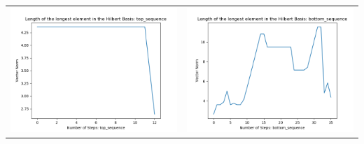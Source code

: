\documentclass[10pt]{article}
\begin{document}
\begin{tabular}{c|c}
\begin{minipage}{.4\textwidth}
\includegraphics[width=\textwidth]{"DATA/4d/4 generators 2 bound A/top_sequence LENGTH"}
\end{minipage} &
\begin{minipage}{.4\textwidth}
\includegraphics[width=\textwidth]{"DATA/4d/4 generators 2 bound A bottomup/bottom_sequence LENGTH"}
\end{minipage}
\end{tabular}
\end{document}
